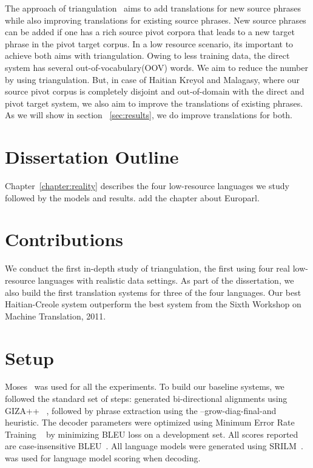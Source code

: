 The approach of triangulation~\cite{Cohn:07,Utiyama:07,Nakov:12} aims to add translations for new source phrases while also improving translations for existing source phrases. New source phrases can be added if one has a rich source pivot corpora that leads to a new target phrase in the pivot target corpus. In a low resource scenario, its important to achieve both aims with triangulation. Owing to less training data, the direct system has several out-of-vocabulary(OOV) words. We aim to reduce the number by using triangulation. But, in case of Haitian Kreyol and Malagasy, where our source pivot corpus is completely disjoint and out-of-domain with the direct and pivot target system, we also aim to improve the translations of existing phrases. As we will show in section ~\ref{sec:results}, we do improve translations for both.  


\section{Dissertation Outline}
\label{sec:outline}
Chapter~\ref{chapter:reality} describes the four low-resource languages we study followed by the models and results. \alert{add the chapter about Europarl}.

\section{Contributions}
\label{sec:summary}
We conduct the first in-depth study of triangulation, the first using four real low-resource languages with realistic data settings. As part of the dissertation, we also build the first translation systems for three of the four languages. Our best Haitian-Creole system outperform the best system from the Sixth Workshop on Machine Translation, 2011. 


\section{Setup}
\label{sec:setup}


Moses~\cite{Koehn:07} was used for all the experiments. To build our baseline systems, we followed the standard set of steps: generated bi-directional alignments using GIZA++ ~\cite{OchNey:03}, followed by phrase extraction using the --grow-diag-final-and heuristic. The decoder parameters were optimized using Minimum Error Rate Training ~\cite{Och:03} by minimizing BLEU loss on a development set. All scores reported are case-insensitive BLEU~\cite{Papineni:02}. All language models were generated using SRILM~\cite{Stolcke:02}.~\cite{Ken:11} was used for language model scoring when decoding.
